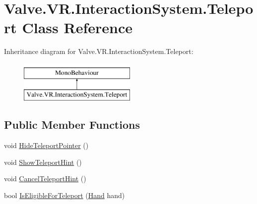 \hypertarget{class_valve_1_1_v_r_1_1_interaction_system_1_1_teleport}{}\section{Valve.\+V\+R.\+Interaction\+System.\+Teleport Class Reference}
\label{class_valve_1_1_v_r_1_1_interaction_system_1_1_teleport}
Inheritance diagram for Valve.\+V\+R.\+Interaction\+System.\+Teleport\+:\begin{figure}[H]
\begin{center}
\leavevmode
\includegraphics[height=2.000000cm]{class_valve_1_1_v_r_1_1_interaction_system_1_1_teleport}
\end{center}
\end{figure}
\subsection*{Public Member Functions}
\begin{DoxyCompactItemize}
\item 
void \mbox{\hyperlink{class_valve_1_1_v_r_1_1_interaction_system_1_1_teleport_a975023207093dcf3476778109d58ab58}{Hide\+Teleport\+Pointer}} ()
\item 
void \mbox{\hyperlink{class_valve_1_1_v_r_1_1_interaction_system_1_1_teleport_ad344594749f35aee26b9823ed4e4e913}{Show\+Teleport\+Hint}} ()
\item 
void \mbox{\hyperlink{class_valve_1_1_v_r_1_1_interaction_system_1_1_teleport_a6a0d34db9fd07f435ef0b0ff071010f9}{Cancel\+Teleport\+Hint}} ()
\item 
bool \mbox{\hyperlink{class_valve_1_1_v_r_1_1_interaction_system_1_1_teleport_aa05ea76b4adebd072549c72f5b1c0b04}{Is\+Eligible\+For\+Teleport}} (\mbox{\hyperlink{class_valve_1_1_v_r_1_1_interaction_system_1_1_hand}{Hand}} hand)
\end{DoxyCompactItemize}
